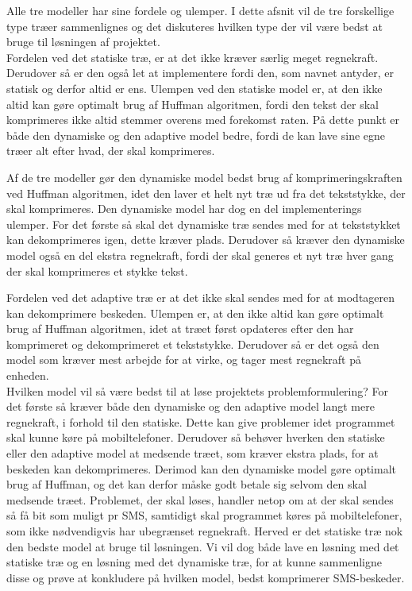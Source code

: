 Alle tre modeller har sine fordele og ulemper. I dette afsnit vil de tre forskellige type træer sammenlignes og det diskuteres hvilken type der vil være bedst at bruge til løsningen af projektet.\\

Fordelen ved det statiske træ, er at det ikke kræver særlig meget regnekraft. Derudover så er den også let at implementere fordi den, som navnet antyder, er statisk og derfor altid er ens. Ulempen ved den statiske model er, at den ikke altid kan gøre optimalt brug af Huffman algoritmen, fordi den tekst der skal komprimeres ikke altid stemmer overens med forekomst raten. På dette punkt er både den dynamiske og den adaptive model bedre, fordi de kan lave sine egne træer alt efter hvad, der skal komprimeres.

Af de tre modeller gør den dynamiske model bedst brug af komprimeringskraften ved Huffman algoritmen, idet den laver et helt nyt træ ud fra det tekststykke, der skal komprimeres. Den dynamiske model har dog en del implementerings ulemper. For det første så skal det dynamiske træ sendes med for at tekststykket kan dekomprimeres igen, dette kræver plads. Derudover så kræver den dynamiske model også en del ekstra regnekraft, fordi der skal generes et nyt træ hver gang der skal komprimeres et stykke tekst.

Fordelen ved det adaptive træ er at det ikke skal sendes med for at modtageren kan dekomprimere beskeden. Ulempen er, at den ikke altid kan gøre optimalt brug af Huffman algoritmen, idet at træet først opdateres efter den har komprimeret og dekomprimeret et tekststykke. Derudover så er det også den model som kræver mest arbejde for at virke, og tager mest regnekraft på enheden.\\

Hvilken model vil så være bedst til at løse projektets problemformulering? For det første så kræver både den dynamiske og den adaptive model langt mere regnekraft, i forhold til den statiske. Dette kan give problemer idet programmet skal kunne køre på mobiltelefoner. Derudover så behøver hverken den statiske eller den adaptive model at medsende træet, som kræver ekstra plads, for at beskeden kan dekomprimeres. Derimod kan den dynamiske model gøre optimalt brug af Huffman, og det kan derfor måske godt betale sig selvom den skal medsende træet. Problemet, der skal løses, handler netop om at der skal sendes så få bit som muligt pr SMS, samtidigt skal programmet køres på mobiltelefoner, som ikke nødvendigvis har ubegrænset regnekraft. Herved er det statiske træ nok den bedste model at bruge til løsningen. Vi vil dog både lave en løsning med det statiske træ og en løsning med det dynamiske træ, for at kunne sammenligne disse og prøve at konkludere på hvilken model, bedst komprimerer SMS-beskeder.